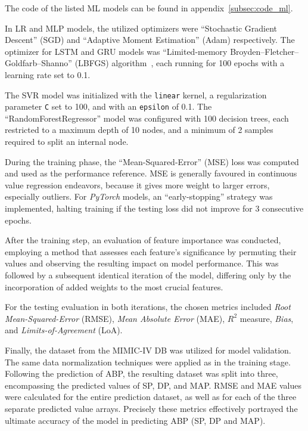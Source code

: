 The code of the listed ML models can be found in appendix~\ref{subsec:code_ml}.

In LR and MLP models, the utilized optimizers were \enquote{Stochastic Gradient Descent} (SGD)\cite{SGDPyTorchDocumentation} and \enquote{Adaptive Moment Estimation} (Adam)\cite{AdamPyTorchDocumentation} respectively.
The optimizer for LSTM and GRU models was \enquote{Limited-memory Broyden–Fletcher–Goldfarb–Shanno} (LBFGS) algorithm~\cite{LBFGSPyTorchDocumentation}, each running for 100 epochs with a learning rate set to 0.1.

The SVR model was initialized with the \texttt{linear} kernel, a regularization parameter \texttt{C} set to 100, and with an \texttt{epsilon} of 0.1.
The \enquote{RandomForestRegressor} model was configured with 100 decision trees, each restricted to a maximum depth of 10 nodes, and a minimum of 2 samples required to split an internal node.

During the training phase, the \enquote{Mean-Squared-Error} (MSE) loss was computed and used as the performance reference.
MSE is generally favoured in continuous value regression endeavors, because it gives more weight to larger errors, especially outliers.
For \textit{PyTorch} models, an \enquote{early-stopping} strategy was implemented, halting training if the testing loss did not improve for 3 consecutive epochs.

After the training step, an evaluation of feature importance was conducted, employing a method that assesses each feature's significance by permuting their values and observing the resulting impact on model performance.
This was followed by a subsequent identical iteration of the model, differing only by the incorporation of added weights to the most crucial features.

For the testing evaluation in both iterations, the chosen metrics included \textit{Root Mean-Squared-Error} (RMSE), \textit{Mean Absolute Error} (MAE), \textit{$R^2$} measure, \textit{Bias}, and \textit{Limits-of-Agreement} (LoA).

Finally, the dataset from the MIMIC-IV DB was utilized for model validation.
The same data normalization techniques were applied as in the training stage.
Following the prediction of ABP, the resulting dataset was split into three, encompassing the predicted values of SP, DP, and MAP\@.
RMSE and MAE values were calculated for the entire prediction dataset, as well as for each of the three separate predicted value arrays.
Precisely these metrics effectively portrayed the ultimate accuracy of the model in predicting ABP (SP, DP and MAP).
